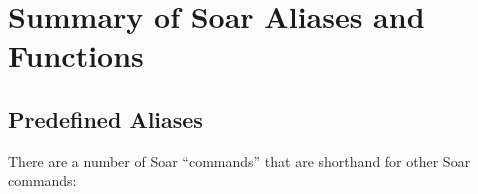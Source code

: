\markboth{}{}
\section*{Summary of Soar Aliases and Functions}
\label{FUNCTIONS}
\label{func-sum}

\subsection*{Predefined Aliases}\vspace{-5pt}
\label{predefined-aliases}

There are a number of Soar ``commands'' that are shorthand for other Soar
commands:

